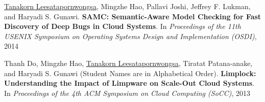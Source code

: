 \documentclass[10pt]{article} %
\begin{document}

\underline{Tanakorn Leesatapornwongsa}, Mingzhe Hao, Pallavi Joshi, Jeffrey F.
Lukman, and Haryadi S. Gunawi. \textbf{SAMC: Semantic-Aware Model Checking for
Fast Discovery of Deep Bugs in Cloud Systems}. In \textit{Proceedings of the
11th USENIX Symposium on Operating Systems Design and Implementation (OSDI)},
2014
\vspace{2mm}

\newpage



Thanh Do, Mingzhe Hao, \underline{Tanakorn Leesatapornwongsa}, Tiratat
Patana-anake, and Haryadi S. Gunawi (Student Names are in Alphabetical Order).
\textbf{Limplock: Understanding the Impact of Limpware on Scale-Out Cloud
Systems}. In \textit{Proceedings of the 4th ACM Symposium on Cloud Computing
(SoCC)}, 2013

\end{document}
